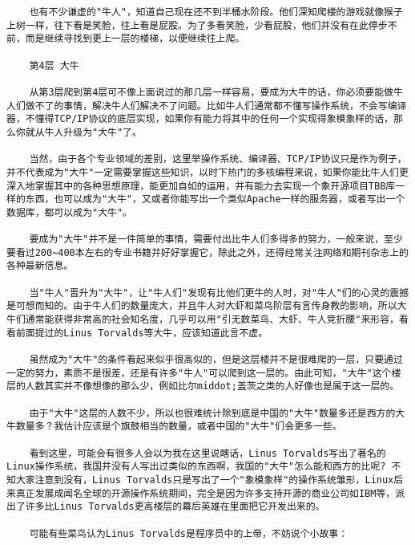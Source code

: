 \begin{verbatim}
    也有不少谦虚的"牛人"，知道自己现在还不到半桶水阶段。他们深知爬楼的游戏就像猴子上树一样，往下看是笑脸，往上看是屁股。为了多看笑脸，少看屁股，他们并没有在此停步不前，而是继续寻找到更上一层的楼梯，以便继续往上爬。

    第4层 大牛

    从第3层爬到第4层可不像上面说过的那几层一样容易，要成为大牛的话，你必须要能做牛人们做不了的事情，解决牛人们解决不了问题。比如牛人们通常都不懂写操作系统，不会写编译器，不懂得TCP/IP协议的底层实现，如果你有能力将其中的任何一个实现得象模象样的话，那么你就从牛人升级为"大牛"了。

    当然，由于各个专业领域的差别，这里举操作系统、编译器、TCP/IP协议只是作为例子，并不代表成为"大牛"一定需要掌握这些知识，以时下热门的多核编程来说，如果你能比牛人们更深入地掌握其中的各种思想原理，能更加自如的运用，并有能力去实现一个象开源项目TBB库一样的东西，也可以成为"大牛"，又或者你能写出一个类似Apache一样的服务器，或者写出一个数据库，都可以成为"大牛"。

    要成为"大牛"并不是一件简单的事情，需要付出比牛人们多得多的努力，一般来说，至少要看过200~400本左右的专业书籍并好好掌握它，除此之外，还得经常关注网络和期刊杂志上的各种最新信息。

    当"牛人"晋升为"大牛"，让"牛人们"发现有比他们更牛的人时，对"牛人"们的心灵的震撼是可想而知的。由于牛人们的数量庞大，并且牛人对大虾和菜鸟阶层有言传身教的影响，所以大牛们通常能获得非常高的社会知名度，几乎可以用"引无数菜鸟、大虾、牛人竞折腰"来形容，看看前面提过的Linus Torvalds等大牛，应该知道此言不虚。

    虽然成为"大牛"的条件看起来似乎很高似的，但是这层楼并不是很难爬的一层，只要通过一定的努力，素质不是很差，还是有许多"牛人"可以爬到这一层的。由此可知，"大牛"这个楼层的人数其实并不像想像的那么少，例如比尔middot;盖茨之类的人好像也是属于这一层的。

    由于"大牛"这层的人数不少，所以也很难统计除到底是中国的"大牛"数量多还是西方的大牛数量多？我估计应该是个旗鼓相当的数量，或者中国的"大牛"们会更多一些。

    看到这里，可能会有很多人会以为我在这里说瞎话，Linus Torvalds写出了著名的Linux操作系统，我国并没有人写出过类似的东西啊，我国的"大牛"怎么能和西方的比呢? 不知大家注意到没有，Linus Torvalds只是写出了一个"象模象样"的操作系统雏形，Linux后来真正发展成闻名全球的开源操作系统期间，完全是因为许多支持开源的商业公司如IBM等，派出了许多比Linus Torvalds更高楼层的幕后英雄在里面把它开发出来的。

    可能有些菜鸟认为Linus Torvalds是程序员中的上帝，不妨说个小故事：


\end{verbatim}
